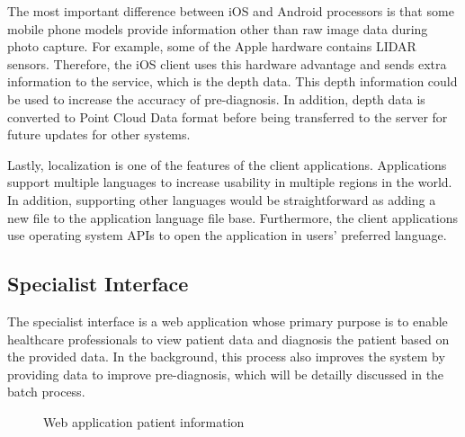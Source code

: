 The most important difference between iOS and Android processors is that some mobile phone models provide information other than raw image data during photo capture. For example, some of the Apple hardware contains LIDAR sensors. Therefore, the iOS client uses this hardware advantage and sends extra information to the service, which is the depth data. This depth information could be used to increase the accuracy of pre-diagnosis. In addition, depth data is converted to Point Cloud Data format before being transferred to the server for future updates for other systems.

Lastly, localization is one of the features of the client applications. Applications support multiple languages to increase usability in multiple regions in the world. In addition, supporting other languages would be straightforward as adding a new file to the application language file base. Furthermore, the client applications use operating system APIs to open the application in users' preferred language.

\subsection{Specialist Interface} \label{sec:SpecialistInterface}

The specialist interface is a web application whose primary purpose is to enable healthcare professionals to view patient data and diagnosis the patient based on the provided data. In the background, this process also improves the system by providing data to improve pre-diagnosis, which will be detailly discussed in the batch process. 

\begin{figure}[htbp]
\centering
{}
\caption{Web application patient information}
\label{fig:WebApplicationPatientInfo}
\end{figure}

